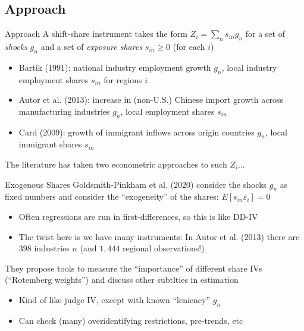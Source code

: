 \documentclass{beamer}
\begin{document}
\subsection{Approach}
\begin{frame}{Approach}
A shift-share instrument takes the form $Z_i=\sum_n s_{in}g_n$ for a set of \emph{shocks} $g_n$ and a set of \emph{exposure shares} $s_{in}\ge 0$ (for each $i$)\smallskip\pause{}
\begin{itemize}
\item Bartik (1991): national industry employment growth $g_n$, local industry employment shares $s_{in}$ for regions $i$\smallskip
\item Autor et al. (2013): increase in (non-U.S.) Chinese import growth across manufacturing industries $g_n$, local employment shares $s_{in}$\smallskip
\item Card (2009): growth of immigrant inflows across origin countries $g_n$, local immigrant shares $s_{in}$
\end{itemize}\medskip\pause{}
The literature has taken two econometric approaches to such $Z_i$...
\end{frame}

\begin{frame}{Exogenous Shares}
Goldsmith-Pinkham et al. (2020) consider the shocks $g_n$ as fixed numbers and consider the ``exogeneity'' of the shares: $E[s_{in}\varepsilon_i]=0$\smallskip
\begin{itemize}
\item Often regressions are run in first-differences, so this is like DD-IV\smallskip
\item The twist here is we have many instruments: In Autor et al. (2013) there are $398$ industries $n$ (and $1,444$ regional observations!)
\end{itemize}\bigskip\pause{}

They propose tools to measure the ``importance'' of different share IVs (``Rotemberg weights'') and discuss other subtlties in estimation\smallskip
\begin{itemize}
\item Kind of like judge IV, except with known ``leniency'' $g_n$\smallskip
\item Can check (many) overidentifying restrictions, pre-trends, etc
\end{itemize}

\end{frame}
\end{document}

